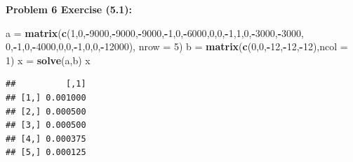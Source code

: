 \documentclass[11pt]{article}
\newenvironment{problem}[1]{\textbf{Problem #1: }}{\newpage}
\newenvironment{Shaded}{\begin{snugshade}}{\end{snugshade}}
\newcommand{\DataTypeTok}[1]{\textcolor[rgb]{0.13,0.29,0.53}{#1}}
\newcommand{\DecValTok}[1]{\textcolor[rgb]{0.00,0.00,0.81}{#1}}
\newcommand{\KeywordTok}[1]{\textcolor[rgb]{0.13,0.29,0.53}{\textbf{#1}}}
\newcommand{\NormalTok}[1]{#1}
\newcommand{\OperatorTok}[1]{\textcolor[rgb]{0.81,0.36,0.00}{\textbf{#1}}}
\newcommand{\StringTok}[1]{\textcolor[rgb]{0.31,0.60,0.02}{#1}}
\begin{document}
\begin{problem}{6 Exercise (5.1)}
\begin{enumerate}[label = (\alph*)]
\begin{Shaded}
\begin{Highlighting}[]
\NormalTok{a =}\StringTok{ }\KeywordTok{matrix}\NormalTok{(}\KeywordTok{c}\NormalTok{(}\DecValTok{1}\NormalTok{,}\DecValTok{0}\NormalTok{,}\OperatorTok{-}\DecValTok{9000}\NormalTok{,}\OperatorTok{-}\DecValTok{9000}\NormalTok{,}\OperatorTok{-}\DecValTok{9000}\NormalTok{,}\OperatorTok{-}\DecValTok{1}\NormalTok{,}\DecValTok{0}\NormalTok{,}\OperatorTok{-}\DecValTok{6000}\NormalTok{,}\DecValTok{0}\NormalTok{,}\DecValTok{0}\NormalTok{,}\OperatorTok{-}\DecValTok{1}\NormalTok{,}\DecValTok{1}\NormalTok{,}\DecValTok{0}\NormalTok{,}\OperatorTok{-}\DecValTok{3000}\NormalTok{,}\OperatorTok{-}\DecValTok{3000}\NormalTok{,}
             \DecValTok{0}\NormalTok{,}\OperatorTok{-}\DecValTok{1}\NormalTok{,}\DecValTok{0}\NormalTok{,}\OperatorTok{-}\DecValTok{4000}\NormalTok{,}\DecValTok{0}\NormalTok{,}\DecValTok{0}\NormalTok{,}\OperatorTok{-}\DecValTok{1}\NormalTok{,}\DecValTok{0}\NormalTok{,}\DecValTok{0}\NormalTok{,}\OperatorTok{-}\DecValTok{12000}\NormalTok{), }\DataTypeTok{nrow =} \DecValTok{5}\NormalTok{)}
\NormalTok{b =}\StringTok{ }\KeywordTok{matrix}\NormalTok{(}\KeywordTok{c}\NormalTok{(}\DecValTok{0}\NormalTok{,}\DecValTok{0}\NormalTok{,}\OperatorTok{-}\DecValTok{12}\NormalTok{,}\OperatorTok{-}\DecValTok{12}\NormalTok{,}\OperatorTok{-}\DecValTok{12}\NormalTok{),}\DataTypeTok{ncol =} \DecValTok{1}\NormalTok{)}
\NormalTok{x =}\StringTok{ }\KeywordTok{solve}\NormalTok{(a,b)}
\NormalTok{x}
\end{Highlighting}
\end{Shaded}

\begin{verbatim}
##          [,1]
## [1,] 0.001000
## [2,] 0.000500
## [3,] 0.000500
## [4,] 0.000375
## [5,] 0.000125
\end{verbatim}


\end{enumerate}
\end{problem}
\end{document}
